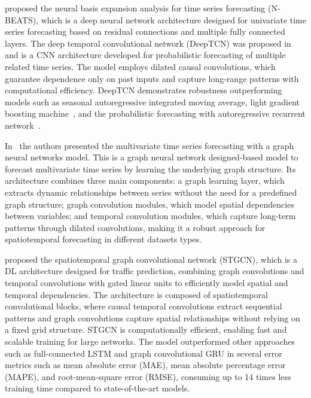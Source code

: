 \citet{NBEATS2020} proposed the neural basis expansion analysis for time series forecasting (N-BEATS), which is a deep neural network architecture designed for univariate time series forecasting based on residual connections and multiple fully connected layers. The deep temporal convolutional network (DeepTCN) was proposed in~\citep{cnnTS2020} and is a CNN architecture developed for probabilistic forecasting of multiple related time series. The model employs dilated causal convolutions, which guarantee dependence only on past inputs and capture long-range patterns with computational efficiency. DeepTCN demonstrates robustness outperforming models such as seasonal autoregressive integrated moving average, light gradient boosting machine~\citep{lightgbmTS2017}, and the probabilistic forecasting with autoregressive recurrent network~\citep{deepARTS2020}.

In~\citep{dotsTS2020} the authors presented the multivariate time series forecasting with a graph neural networks model. This is a graph neural network designed-based model to forecast multivariate time series by learning the underlying graph structure. Its architecture combines three main components: a graph learning layer, which extracts dynamic relationships between series without the need for a predefined graph structure; graph convolution modules, which model spatial dependencies between variables; and temporal convolution modules, which capture long-term patterns through dilated convolutions, making it a robust approach for spatiotemporal forecasting in different datasets types.

\citet{spatioTS2018} proposed the spatiotemporal graph convolutional network (STGCN), which is a DL architecture designed for traffic prediction, combining graph convolutions and temporal convolutions with gated linear units to efficiently model spatial and temporal dependencies. The architecture is composed of spatiotemporal convolutional blocks, where causal temporal convolutions extract sequential patterns and graph convolutions capture spatial relationships without relying on a fixed grid structure. STGCN is computationally efficient, enabling fast and scalable training for large networks. The model outperformed other approaches such as 
full-connected LSTM and graph convolutional GRU in several error metrics such as mean absolute error (MAE), mean absolute percentage error (MAPE), and root-mean-square error (RMSE), consuming up to 14 times less training time compared to state-of-the-art models.

